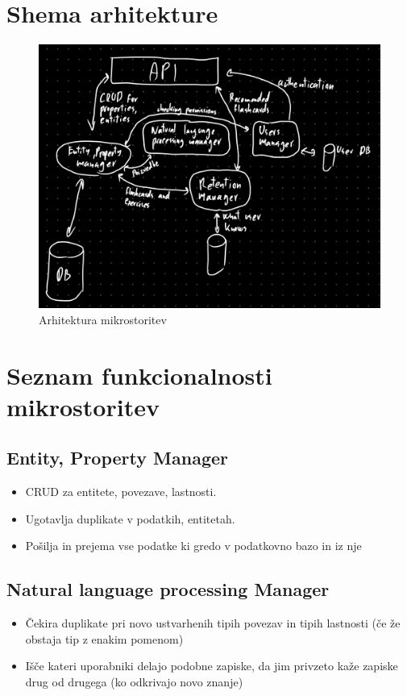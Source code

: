 \documentclass{article}
\begin{document}
\section{Shema arhitekture}
\begin{figure}[h]
    \centering
    \includegraphics[width=\textwidth]{data/microservices_structure_1.png}
    \caption{Arhitektura mikrostoritev}
\end{figure}

\section{Seznam funkcionalnosti mikrostoritev}

\subsection{Entity, Property Manager}
\begin{itemize}
    \item CRUD za entitete, povezave, lastnosti.
    \item Ugotavlja duplikate v podatkih, entitetah.
    \item Pošilja in prejema vse podatke ki gredo v podatkovno bazo in iz nje
\end{itemize}

\subsection{Natural language processing Manager}
\begin{itemize}
    \item Čekira duplikate pri novo ustvarhenih tipih povezav in tipih lastnosti (če že obstaja tip z enakim pomenom)
    \item Išče kateri uporabniki delajo podobne zapiske, da jim privzeto kaže zapiske drug od drugega (ko odkrivajo novo znanje)
\end{itemize}
\end{document}
